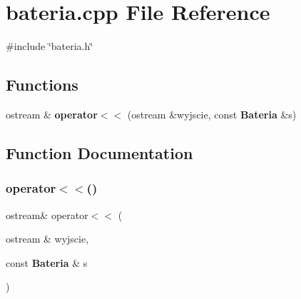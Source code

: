 \section{bateria.\+cpp File Reference}
\label{bateria_8cpp}
{\ttfamily \#include \char`\"{}bateria.\+h\char`\"{}}\newline
\subsection*{Functions}
\begin{DoxyCompactItemize}
\item 
ostream \& \textbf{ operator$<$$<$} (ostream \&wyjscie, const \textbf{ Bateria} \&s)
\end{DoxyCompactItemize}


\subsection{Function Documentation}
\mbox{\label{bateria_8cpp_a47035e47d5dc1f14ae25b6033bf175dc}} 
\subsubsection{operator$<$$<$()}
{\footnotesize\ttfamily ostream\& operator$<$$<$ (\begin{DoxyParamCaption}\item[{ostream \&}]{wyjscie,  }\item[{const \textbf{ Bateria} \&}]{s }\end{DoxyParamCaption})}

